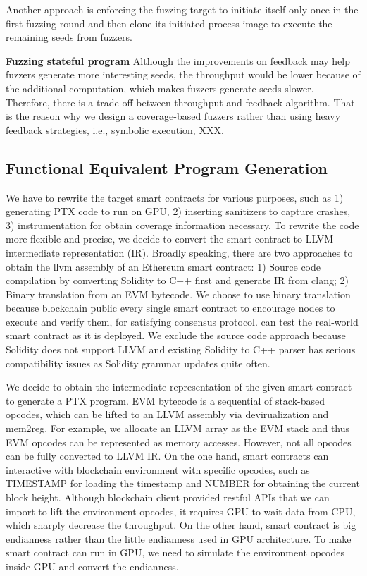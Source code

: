 Another approach is enforcing the fuzzing target to initiate itself only once in the first fuzzing round and then clone its initiated process image to execute the remaining seeds from fuzzers. 



\noindent \textbf{Fuzzing stateful program}
Although the improvements on feedback may help fuzzers generate more interesting seeds, the throughput would be lower because of the additional computation, which makes fuzzers generate seeds slower. Therefore, there is a trade-off between throughput and feedback algorithm. 
That is the reason why we design a coverage-based fuzzers rather than using heavy feedback strategies, i.e., symbolic execution\cite{ilf}, XXX. 

\subsection{Functional Equivalent Program Generation}

We have to rewrite the target smart contracts for various purposes, such as 1) generating PTX code to run on GPU, 2) inserting sanitizers to capture crashes, 3) instrumentation for obtain coverage information necessary. 
To rewrite the code more flexible and precise, we decide to convert the smart contract to LLVM intermediate representation (IR).  
%
Broadly speaking, there are two approaches to obtain the llvm assembly of an Ethereum smart contract: 1) Source code compilation by converting Solidity to C++ first and generate IR from clang\cite{}; 2) Binary translation from an EVM bytecode. 
We choose to use binary translation because blockchain public every single smart contract to encourage nodes to execute and verify them, for satisfying consensus protocol. {\tool} can test the real-world smart contract as it is deployed. 
We exclude the source code approach because Solidity does not support LLVM and existing Solidity to C++ parser has serious compatibility issues as Solidity grammar updates quite often. 


\noindent \textbf{{\translator}}
We decide to obtain the intermediate representation of the given smart contract to generate a PTX program. 
EVM bytecode is a sequential of stack-based opcodes, which can be lifted to an LLVM assembly via devirualization and mem2reg\cite{}. For example, we allocate an LLVM array as the EVM stack and thus EVM opcodes can be represented as memory accesses. 
However, not all opcodes can be fully converted to LLVM IR.
On the one hand, smart contracts can interactive with blockchain environment with specific opcodes, such as TIMESTAMP for loading the timestamp and NUMBER for obtaining the current block height. Although blockchain client provided restful APIs that we can import to lift the environment opcodes, it requires GPU to wait data from CPU, which sharply decrease the {\tool} throughput.
%
On the other hand, smart contract is big endianness rather than the little endianness used in GPU architecture. 
To make smart contract can run in GPU, we need to simulate the environment opcodes inside GPU and convert the endianness. 



